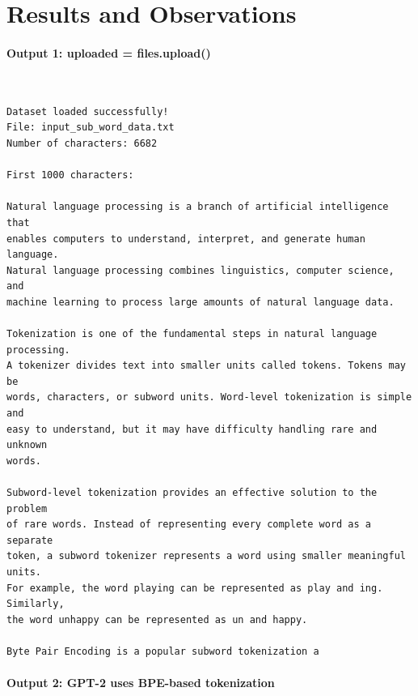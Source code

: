 \documentclass[12pt,a4paper,oneside]{report}
\begin{document}
\section{Results and Observations}
\paragraph{Output 1: uploaded = files.upload()}\mbox{}\\[-1ex]
\begin{Verbatim}[commandchars=\\\{\},breaklines=true,breakanywhere=true,fontsize=\scriptsize,frame=leftline,framesep=2mm,rulecolor=\color{gray}]
Dataset loaded successfully!
File: input_sub_word_data.txt
Number of characters: 6682

First 1000 characters:

Natural language processing is a branch of artificial intelligence that
enables computers to understand, interpret, and generate human language.
Natural language processing combines linguistics, computer science, and
machine learning to process large amounts of natural language data.

Tokenization is one of the fundamental steps in natural language processing.
A tokenizer divides text into smaller units called tokens. Tokens may be
words, characters, or subword units. Word-level tokenization is simple and
easy to understand, but it may have difficulty handling rare and unknown
words.

Subword-level tokenization provides an effective solution to the problem
of rare words. Instead of representing every complete word as a separate
token, a subword tokenizer represents a word using smaller meaningful units.
For example, the word playing can be represented as play and ing. Similarly,
the word unhappy can be represented as un and happy.

Byte Pair Encoding is a popular subword tokenization a
\end{Verbatim}
\paragraph{Output 2: GPT-2 uses BPE-based tokenization}\mbox{}\\[-1ex]
\end{document}
